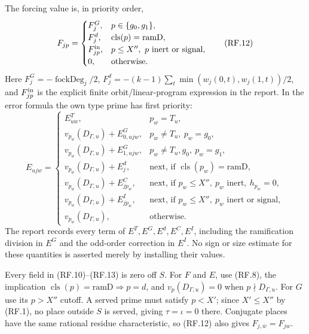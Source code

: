 \documentclass[11pt,a4paper]{article}
\numberwithin{equation}{section}
\theoremstyle{remark}\newtheorem{remark}[theorem]{Remark}
\begin{document}
The forcing value is, in priority order,
\[
 F_{jp}=\begin{cases}
 F^G_j,&p\in\{g_0,g_1\},\\
 F^d_j,&\operatorname{cls}(p)=\mathrm{ramD},\\
 F^{\rm in}_{jp},&p\leq X'',\ p\text{ inert or signal},\\
 0,&\text{otherwise}.
 \end{cases}                                                  \tag{RF.12}
\]
Here $F^G_j=-\operatorname{fockDeg}_j/2$,
$F^d_j=-(k-1)\sum_t\min(w_j(0,t),w_j(1,t))/2$, and
$F^{\rm in}_{jp}$ is the explicit finite orbit/linear-program expression
in the report. In the error formula the own type prime has first priority:
\[
 E_{ujw}=\begin{cases}
 E^T_{uw},&p_w=T_u,\\
 v_{p_w}(D_{\Gamma,u})+E^G_{0,ujw},&p_w\ne T_u,\ p_w=g_0,\\
 v_{p_w}(D_{\Gamma,u})+E^G_{1,ujw},&p_w\ne T_u,g_0,\ p_w=g_1,\\
 v_{p_w}(D_{\Gamma,u})+E^d_j,&\text{next, if }\operatorname{cls}(p_w)=\mathrm{ramD},\\
 v_{p_w}(D_{\Gamma,u})+E^C_{jp_w},&\text{next, if }p_w\leq X'',\ p_w\text{ inert},\ h_{p_w}=0,\\
 v_{p_w}(D_{\Gamma,u})+E^I_{jp_w},&\text{next, if }p_w\leq X'',\ p_w\text{ inert or signal},\\
 v_{p_w}(D_{\Gamma,u}),&\text{otherwise}.
 \end{cases}                                                  \tag{RF.13}
\]
The report records every term of $E^T,E^G,E^d,E^C,E^I$, including the
ramification division in $E^G$ and the odd-order correction in $E^I$.
No sign or size estimate for these quantities is asserted merely by
installing their values.

Every field in (RF.10)--(RF.13) is zero off $S$. For $F$ and $E$, use
(RF.8), the implication $\operatorname{cls}(p)=\mathrm{ramD}\Rightarrow
p=d$, and $v_p(D_{\Gamma,u})=0$ when $p\nmid D_{\Gamma,u}$.
For $G$ use its $p>X''$ cutoff. A served prime must satisfy $p<X'$;
since $X'\leq X''$ by (RF.1), no place outside $S$ is served, giving
$\tau=\iota=0$ there. Conjugate places have the same rational residue
characteristic, so (RF.12) also gives $F_{j,\bar w}=F_{jw}$.
\end{document}
